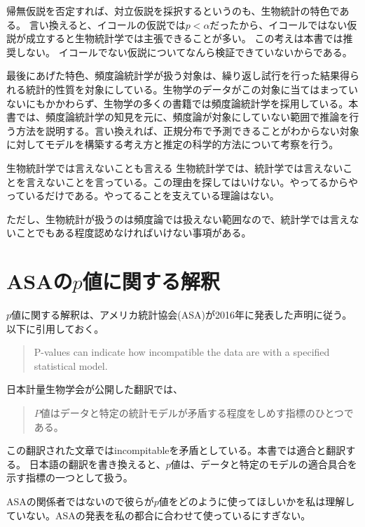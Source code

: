 
帰無仮説を否定すれば、対立仮説を採択するというのも、生物統計の特色である。
言い換えると、イコールの仮説では$p<\alpha$だったから、イコールではない仮説が成立すると生物統計学では主張できることが多い。
この考えは本書では推奨しない。
イコールでない仮説についてなんら検証できていないからである。


最後にあげた特色、頻度論統計学が扱う対象は、繰り返し試行を行った結果得られる統計的性質を対象にしている。生物学のデータがこの対象に当てはまっていないにもかかわらず、生物学の多くの書籍では頻度論統計学を採用している。本書では、頻度論統計学の知見を元に、頻度論が対象にしていない範囲で推論を行う方法を説明する。言い換えれば、正規分布で予測できることがわからない対象に対してモデルを構築する考え方と推定の科学的方法について考察を行う。

\begin{SMbox}{生物統計学では言えないことも言える}
    生物統計学では、統計学では言えないことを言えないことを言っている。この理由を探してはいけない。やってるからやっているだけである。やってることを支えている理論はない。
    
    ただし、生物統計が扱うのは頻度論では扱えない範囲なので、統計学では言えないことでもある程度認めなければいけない事項がある。
\end{SMbox}

\section{ASAの$p$値に関する解釈}
$p$値に関する解釈は、アメリカ統計協会(ASA)が2016年に発表した声明に従う\cite{doi:10.1080/00031305.2016.1154108}。以下に引用しておく。
\begin{quote}
    P-values can indicate how incompatible the data are with a specified statistical model.
\end{quote}
日本計量生物学会が公開した翻訳では、
\begin{quote}
    $P$値はデータと特定の統計モデルが矛盾する程度をしめす指標のひとつである。
\end{quote}
この翻訳された文章ではincompitableを矛盾としている。本書では適合と翻訳する。
日本語の翻訳を書き換えると、$p$値は、データと特定のモデルの適合具合を示す指標の一つとして扱う。


ASAの関係者ではないので彼らが$p$値をどのように使ってほしいかを私は理解していない。ASAの発表を私の都合に合わせて使っているにすぎない。

